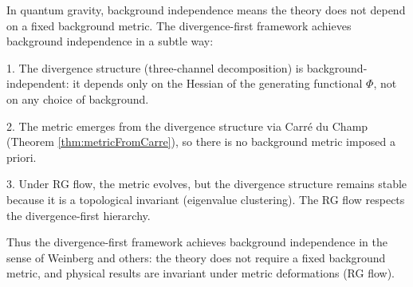 \begin{remark}
\label{rem:backgroundIndependenceConnection}

In quantum gravity, background independence means the theory does not depend on a fixed background metric. The divergence-first framework achieves background independence in a subtle way:

1. The divergence structure (three-channel decomposition) is background-independent: it depends only on the Hessian of the generating functional $\Phi$, not on any choice of background.

2. The metric emerges from the divergence structure via Carré du Champ (Theorem \ref{thm:metricFromCarre}), so there is no background metric imposed a priori.

3. Under RG flow, the metric evolves, but the divergence structure remains stable because it is a topological invariant (eigenvalue clustering). The RG flow respects the divergence-first hierarchy.

Thus the divergence-first framework achieves background independence in the sense of Weinberg and others: the theory does not require a fixed background metric, and physical results are invariant under metric deformations (RG flow).

\end{remark}

